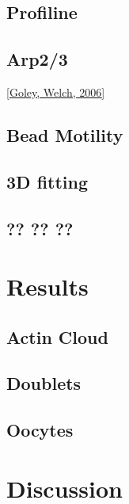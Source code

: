 \documentclass[A4paperpaper,11pt,english]{sphinxmanual}
\begin{document}
\section{Profiline}
\label{parts/part2:profiline}

\section{Arp2/3}
\label{parts/part2:arp2-3}
{\hyperref[bibitem:goley2006]{{[}Goley, Welch,  2006{]}}}


\section{Bead Motility}
\label{parts/part2:bead-motility}

\section{3D fitting}
\label{parts/part2:d-fitting}

\section{?? ?? ??}
\label{parts/part2:id2}

\chapter{Results}
\label{parts/part3::doc}\label{parts/part3:results}

\section{Actin Cloud}
\label{parts/part3:actin-cloud}

\section{Doublets}
\label{parts/part3:doublets}

\section{Oocytes}
\label{parts/part3:oocytes}

\chapter{Discussion}
\label{parts/part4:discussion}\label{parts/part4::doc}
\end{document}
